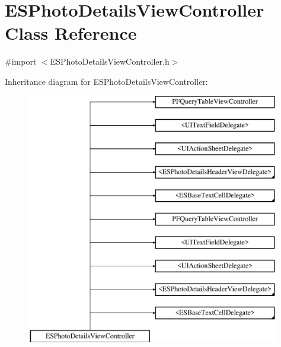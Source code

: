 \hypertarget{interface_e_s_photo_details_view_controller}{}\section{E\+S\+Photo\+Details\+View\+Controller Class Reference}
\label{interface_e_s_photo_details_view_controller}


{\ttfamily \#import $<$E\+S\+Photo\+Details\+View\+Controller.\+h$>$}

Inheritance diagram for E\+S\+Photo\+Details\+View\+Controller\+:\begin{figure}[H]
\begin{center}
\leavevmode
\includegraphics[height=11.000000cm]{interface_e_s_photo_details_view_controller}
\end{center}
\end{figure}
